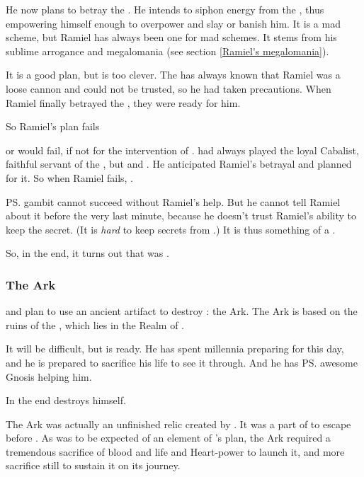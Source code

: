He now plans to betray the \banes. 
He intends to siphon energy from the \Voidbringer, thus empowering himself enough to overpower \Daggerrain{} and slay or banish him. 
It is a mad scheme, but Ramiel has always been one for mad schemes. It stems from his sublime arrogance and megalomania (see section \ref{Ramiel's megalomania}). 

It is a good plan, but \Daggerrain{} is too clever. 
The \banelord{} has always known that Ramiel was a loose cannon and could not be trusted, so he had taken precautions. 
When Ramiel finally betrayed the \banes, they were ready for him. 

So Ramiel's plan fails\prikker

\prikker or would fail, if not for the intervention of \Azraid. 
\Azraid{} had always played the loyal Cabalist, faithful servant of the \banelords, but  and . 
He anticipated Ramiel's betrayal and planned for it. 
So when Ramiel fails, . 

\ps{\Azraid} gambit cannot succeed without Ramiel's help. 
But he cannot tell Ramiel about it before the very last minute, because he doesn't trust Ramiel's ability to keep the secret. 
(It is \emph{hard} to keep secrets from \Daggerrain.) 
It is thus something of a . 

So, in the end, it turns out that \Azraid{} was . 





\subsubsection{The Ark}
\Azraid{} and \Ishnaruchaefir plan to use an ancient artifact to destroy \Daggerrain: the Ark. 
The Ark is based on the ruins of the , which lies in the Realm of . 

It will be difficult, but \Azraid{} is ready. 
He has spent millennia preparing for this day, and he is prepared to sacrifice his life to see it through. 
And he has \ps{\Ishnaruchaefir} awesome Gnosis helping him. 

In the end \Azraid{} destroys himself.  

The Ark was actually an unfinished relic created by \Sethicus. 
It was a part of  to escape \Miith before . 
As was to be expected of an element of \Sethicus's plan, the Ark required a tremendous sacrifice of blood and life and Heart-power to launch it, and more sacrifice still to sustain it on its journey. 





